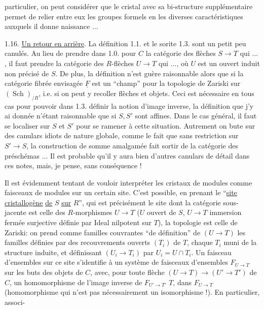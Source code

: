 particulier, on peut considérer que le cristal avec sa bi-structure supplémentaire permet de relier entre eux les groupes formels en les diverses caractéristiques auxquels il donne naissance $\ldots$

1.16. \uline{Un retour en arrière}. La définition 1.1. et le sorite 1.3. sont un petit peu canulés. Au lieu de prendre dans 1.0. pour $C$ la catégorie des flèches $S\longrightarrow T$ qui $\ldots$, il faut prendre la catégorie des $R$-flèches $U\longrightarrow T$ qui $\ldots$, où $U$ est un ouvert induit non précisé de $S$. De plus,  la définition n'est guère raisonnable alors que si la catégorie fibrée envisagée $\underline{F}$ est un ``champ'' pour la topologie de Zariski sur $(\operatorname{Sch})_{/R}$, i.e. si on peut y recoller flèches et objets. Ceci est nécessaire en tous cas pour pouvoir dans 1.3. définir la notion d'image inverse, la définition que j'y ai donnée n'étant raisonnable que si $S,S'$ sont affines. Dans le cas général, il faut se localiser sur $S$ et $S'$ pour se ramener à cette situation. Autrement on bute sur des canulars idiots de nature globale, comme le fait que sans restriction sur $S'\to S$, la construction   de somme amalgamée fait sortir de la catégorie des préschémas $\ldots$ Il est probable qu'il y aura bien d'autres canulars de détail dans ces notes, mais, je pense, sans conséquence !

Il est évidemment tentant de vouloir interpréter les cristaux de modules comme faisceaux de modules sur un certain site. C'est possible, en prenant le ``\uline{site cristallogène} \uline{de} $S$ \uline{sur} $R$'', qui est précisément le site dont la catégorie sous-jacente  est celle des $R$-morphismes $U\longrightarrow T$ ($U$ ouvert de $S$, $U\longrightarrow T$ immersion fermée surjective définie par Ideal nilpotent sur $T$), la topologie est celle de Zariski: on prend comme familles couvrantes ``de définition'' de $(U\longrightarrow T)$ les familles définies par des recouvrements ouverts $(T_i)$ de $T$, chaque $T_i$ muni de la structure induite, et définissant $(U_i\longrightarrow T_i)$ par $U_i=U\cap T_i$. Un faisceau d'ensembles sur ce site s'identifie à un système de faisceaux d'ensembles $F_{U\to T}$ sur les  buts des objets de $C$, avec, pour toute flèche $(U\longrightarrow T)\longrightarrow(U'\longrightarrow T')$ de $C$, un homomorphisme de l'image inverse de $F_{U'\to T'}$    $T$, dans $F_{U\to T}$ (homomorphisme qui n'est pas nécessairement un isomorphisme !). En particulier, associ-
